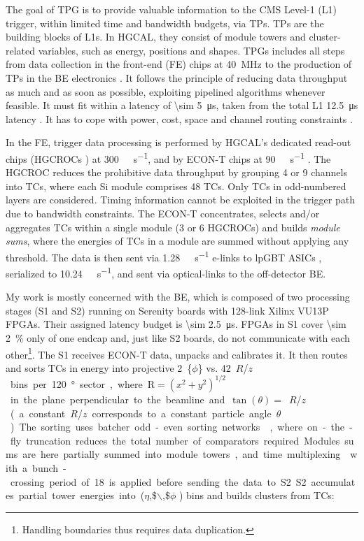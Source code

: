 \documentclass[11pt]{article}
\newcommand{\azimuth}{$\phi$}
\newcommand{\rapidity}{$\eta$}
\newcommand{\rz}{$R$/$z$}
\begin{document}
The goal of \ac{TPG} is to provide valuable information to the CMS Level-1 (L1) trigger, within limited time and bandwidth budgets, via \acp{TP}.
\acp{TP} are the building blocks of \acp{L1}.
In HGCAL, they consist of module towers and cluster-related variables, such as energy, positions and shapes.
\acp{TPG} includes all steps from data collection in the front-end (FE) chips at \SI{40}{\mega\hertz} to the production of \acp{TP} in the \ac{BE} electronics \cite{hgcalTDR}.
It follows the principle of reducing data throughput as much and as soon as possible, exploiting pipelined algorithms whenever feasible.
It must fit within a latency of \SI{\sim 5}{\micro\second}, taken from the total L1 \SI{12.5}{\micro\second} latency \cite{l1TDR}.
It has to cope with power, cost, space and channel routing constraints \cite{jb_hdr}.

In the \ac{FE}, trigger data processing is performed by \ac{HGCAL}'s dedicated read-out chips (\acp{HGCROC} \cite{hgcroc}) at \SI{300}{\tera\byte\per\second}, and by \ac{ECON-T} chips at \SI{90}{\tera\byte\per\second} \cite{econ,hgcalTDR}.
The \ac{HGCROC} reduces the prohibitive data throughput by grouping 4 or 9 channels into \acp{TC}, where each \ac{Si} module comprises 48 \acp{TC}.
Only \acp{TC} in odd-numbered layers are considered.
Timing information cannot be exploited in the trigger path due to bandwidth constraints.
The ECON-T concentrates, selects and/or aggregates TCs within a single module (3 or 6 \acp{HGCROC}) and builds \textit{module sums}, where the energies of TCs in a module are summed without applying any threshold.
The data is then sent via \SI{1.28}{\giga\bit\per\second} e-links to lpGBT ASICs \cite{lpgbt}, serialized to \SI{10.24}{\giga\bit\per\second}, and sent via optical-links \cite{vtrxp} to the off-detector \ac{BE}.

My work is mostly concerned with the \ac{BE}, which is composed of two processing stages (\ac{S1} and \ac{S2}) running on Serenity boards \cite{serenity} with 128-link Xilinx VU13P FPGAs.
Their assigned latency budget is \SI{\sim 2.5}{\micro\second}.
\acp{FPGA} in \ac{S1} cover \SI{\sim 2}{\percent} only of one endcap and, just like \ac{S2} boards, do not communicate with each other\footnote{Handling boundaries thus requires data duplication.}.
The \ac{S1} receives \ac{ECON-T} data, unpacks and calibrates it.
It then routes and sorts \acp{TC} in energy into projective \SI{2}\{\azimuth{}\} vs. \SI{42}{\rz} bins per \SI{120}{\degree} sector, where \(\text{R}=(x^{2}+y^{2})^{1/2}\) in the plane perpendicular to the beamline and \(\tan(\theta)=\) \si{\rz} (a constant \si{\rz} corresponds to a constant particle angle \(\theta\)).
The sorting uses batcher odd-even sorting networks \cite{sort_net2,calorPortales,sort_net}, where on-the-fly truncation reduces the total number of comparators required.
Modules sums are here partially summed into module towers, and time multiplexing \cite{zabi} with a bunch-crossing period of 18 is applied before sending the data to \ac{S2}.
\ac{S2} accumulates partial tower energies into (\rapidity{},\$$\backslash$,\$\azimuth{} ) bins and builds clusters from \acp{TC}:
\end{document}
